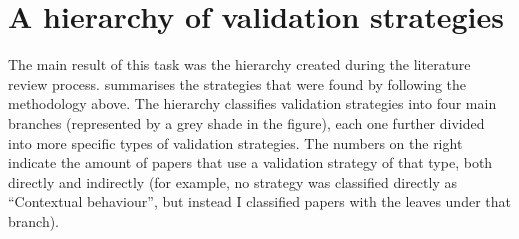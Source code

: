 \section{A hierarchy of validation strategies} \label{sec:validation/hierarchy}

The main result of this task was the hierarchy created during the literature review process.  summarises the strategies that were found by following the methodology above. The hierarchy classifies validation strategies into four main branches (represented by a grey shade in the figure), each one further divided into more specific types of validation strategies. The numbers on the right indicate the amount of papers that use a validation strategy of that type, both directly and indirectly (for example, no strategy was classified directly as ``Contextual behaviour'', but instead I classified papers with the leaves under that branch).

